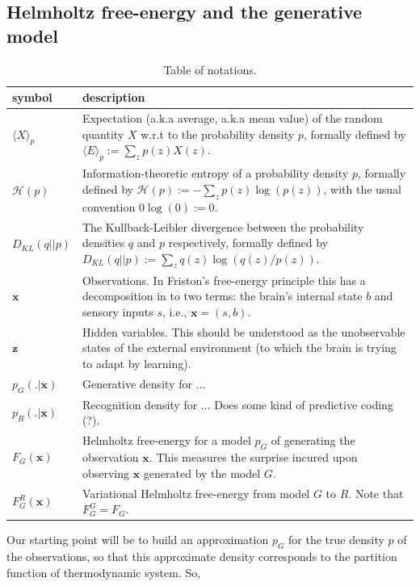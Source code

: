 \documentclass[10pt,letterpaper]{article}
\def\z{\mathbf{z}}
\def\x{\mathbf{x}}
\begin{document}
\subsection{Helmholtz free-energy and the generative model}
\begin{table}[H]
  \begin{tabular}{p{2cm}|p{11cm}}
         \hline
         \textbf{symbol}    & \textbf{description}  \\ \hline
         $\langle X\rangle_p$ & Expectation (a.k.a average, a.k.a mean value) of the
         random quantity $X$ w.r.t to the probability density $p$, formally defined by $\langle E\rangle_p := \sum_{z}p(z)X(z)$.\\ \hline
         $\mathcal H(p)$ & Information-theoretic entropy of a probability density $p$, formally defined by $\mathcal H(p) := -\sum_{z}p(z)\log(p(z))$,
          with the usual convention $0 \log(0) := 0$.\\ \hline
         $D_{KL}(q||p)$ & The Kullback-Leibler divergence between the probability densities $q$ and $p$ respectively, formally defined by $D_{KL}(q||p) := \sum_{z}q(z)\log(q(z)/p(z))$.\\ \hline
             $\x$ & Observations. In Friston's free-energy principle this has a decomposition in to two terms: the brain's internal state $b$ and sensory inputs $s$, i.e., $\x = (s, b).$ \\ \hline
             $\z$ & Hidden variables. This should be understood as the unobservable states of the external environment (to which the brain is trying to adapt by learning).\\ \hline
             $p_G(.|\x)$ & Generative density for ...\\ \hline
         $p_R(.|\x)$ & Recognition density for ... Does some kind of predictive coding (?).\\ \hline
         $F_G(\x)$ & Helmholtz free-energy for a model $p_G$ of generating the observation $\x$. This measures the surprise incured upon observing $\x$ generated by the model $G$.\\ \hline
         $F^R_G(\x)$ & Variational Helmholtz free-energy from model $G$
          to $R$.  Note that $F^G_G = F_G$.\\ \hline
  \end{tabular}
  \caption{Table of notations.}
\end{table}
Our starting point will be to build an approximation $p_G$ for the true density $p$ of the observations, so that this approximate density corresponds to the partition function of thermodynamic system. So,
\end{document}
